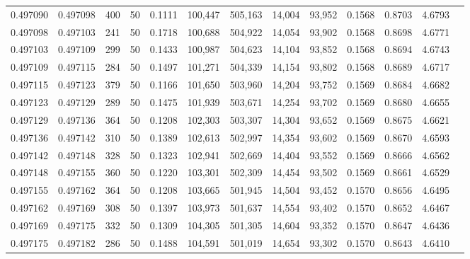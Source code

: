 \begin{tabular}{rrrrrrrrrrrrr}
0.497090 & 0.497098 & 400 &  50 &                                     0.1111 & 100,447 & 505,163 &  14,004 &  93,952 & 0.1568 & 0.8703 & 4.6793 \\
0.497098 & 0.497103 & 241 &  50 &                                     0.1718 & 100,688 & 504,922 &  14,054 &  93,902 & 0.1568 & 0.8698 & 4.6771 \\
0.497103 & 0.497109 & 299 &  50 &                                     0.1433 & 100,987 & 504,623 &  14,104 &  93,852 & 0.1568 & 0.8694 & 4.6743 \\
0.497109 & 0.497115 & 284 &  50 &                                     0.1497 & 101,271 & 504,339 &  14,154 &  93,802 & 0.1568 & 0.8689 & 4.6717 \\
0.497115 & 0.497123 & 379 &  50 &                                     0.1166 & 101,650 & 503,960 &  14,204 &  93,752 & 0.1569 & 0.8684 & 4.6682 \\
0.497123 & 0.497129 & 289 &  50 &                                     0.1475 & 101,939 & 503,671 &  14,254 &  93,702 & 0.1569 & 0.8680 & 4.6655 \\
0.497129 & 0.497136 & 364 &  50 &                                     0.1208 & 102,303 & 503,307 &  14,304 &  93,652 & 0.1569 & 0.8675 & 4.6621 \\
0.497136 & 0.497142 & 310 &  50 &                                     0.1389 & 102,613 & 502,997 &  14,354 &  93,602 & 0.1569 & 0.8670 & 4.6593 \\
0.497142 & 0.497148 & 328 &  50 &                                     0.1323 & 102,941 & 502,669 &  14,404 &  93,552 & 0.1569 & 0.8666 & 4.6562 \\
0.497148 & 0.497155 & 360 &  50 &                                     0.1220 & 103,301 & 502,309 &  14,454 &  93,502 & 0.1569 & 0.8661 & 4.6529 \\
0.497155 & 0.497162 & 364 &  50 &                                     0.1208 & 103,665 & 501,945 &  14,504 &  93,452 & 0.1570 & 0.8656 & 4.6495 \\
0.497162 & 0.497169 & 308 &  50 &                                     0.1397 & 103,973 & 501,637 &  14,554 &  93,402 & 0.1570 & 0.8652 & 4.6467 \\
0.497169 & 0.497175 & 332 &  50 &                                     0.1309 & 104,305 & 501,305 &  14,604 &  93,352 & 0.1570 & 0.8647 & 4.6436 \\
0.497175 & 0.497182 & 286 &  50 &                                     0.1488 & 104,591 & 501,019 &  14,654 &  93,302 & 0.1570 & 0.8643 & 4.6410 \\

\end{tabular}
